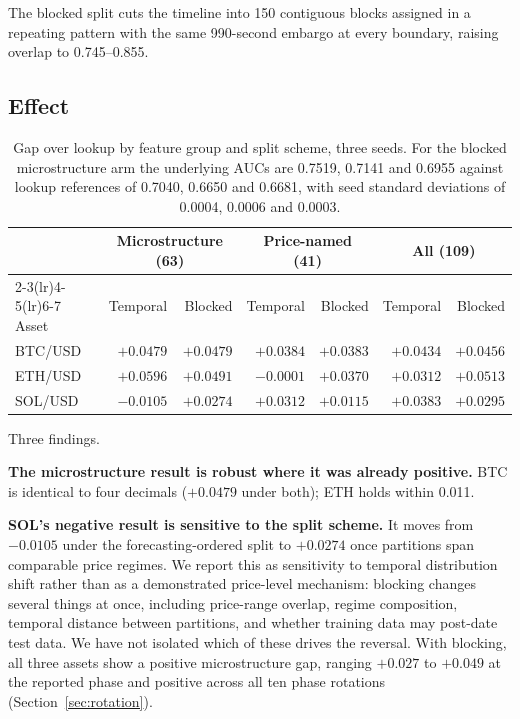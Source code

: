 \documentclass[11pt]{article}
\begin{document}
The blocked split cuts the timeline into 150 contiguous blocks assigned in a
repeating pattern with the same 990-second embargo at every boundary, raising
overlap to 0.745--0.855.

\subsection{Effect}

\begin{table}[ht]
\centering
\caption{Gap over lookup by feature group and split scheme, three seeds. For
the blocked microstructure arm the underlying AUCs are 0.7519, 0.7141 and
0.6955 against lookup references of 0.7040, 0.6650 and 0.6681, with seed
standard deviations of 0.0004, 0.0006 and 0.0003.}
\label{tab:regime}
\begin{tabular}{lrrrrrr}
\toprule
& \multicolumn{2}{c}{Microstructure (63)} & \multicolumn{2}{c}{Price-named (41)}
& \multicolumn{2}{c}{All (109)} \\
\cmidrule(lr){2-3}\cmidrule(lr){4-5}\cmidrule(lr){6-7}
Asset & Temporal & Blocked & Temporal & Blocked & Temporal & Blocked \\
\midrule
BTC/USD & $+0.0479$ & $+0.0479$ & $+0.0384$ & $+0.0383$ & $+0.0434$ & $+0.0456$ \\
ETH/USD & $+0.0596$ & $+0.0491$ & $-0.0001$ & $+0.0370$ & $+0.0312$ & $+0.0513$ \\
SOL/USD & $-0.0105$ & $+0.0274$ & $+0.0312$ & $+0.0115$ & $+0.0383$ & $+0.0295$ \\
\bottomrule
\end{tabular}
\end{table}

\noindent
Three findings.

\textbf{The microstructure result is robust where it was already positive.} BTC
is identical to four decimals ($+0.0479$ under both); ETH holds within
0.011.

\textbf{SOL's negative result is sensitive to the split scheme.} It moves from
$-0.0105$ under the forecasting-ordered split to $+0.0274$ once partitions span
comparable price regimes. We report this as sensitivity to temporal
distribution shift rather than as a demonstrated price-level mechanism:
blocking changes several things at once, including price-range overlap, regime
composition, temporal distance between partitions, and whether training data
may post-date test data. We have not isolated which of these drives the
reversal. With
blocking, all three assets show a positive microstructure gap, ranging
$+0.027$ to $+0.049$ at the reported phase and positive across all ten phase
rotations (Section~\ref{sec:rotation}).
\end{document}

